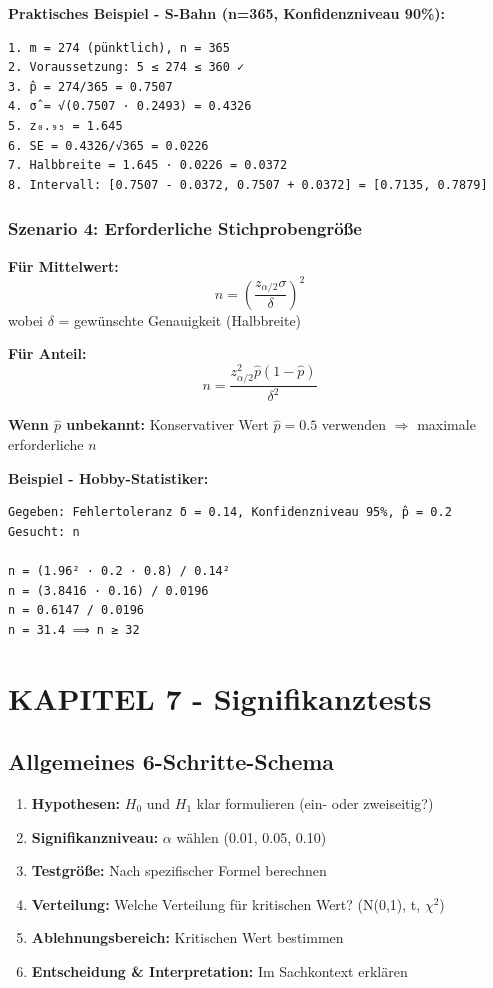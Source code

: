 \documentclass[12pt, a4paper, ngerman]{scrartcl}
\begin{document}
\textbf{Praktisches Beispiel - S-Bahn (n=365, Konfidenzniveau 90\%):}
\begin{verbatim}
1. m = 274 (pünktlich), n = 365
2. Voraussetzung: 5 ≤ 274 ≤ 360 ✓
3. p̂ = 274/365 = 0.7507
4. σ̂ = √(0.7507 · 0.2493) = 0.4326
5. z₀.₉₅ = 1.645
6. SE = 0.4326/√365 = 0.0226
7. Halbbreite = 1.645 · 0.0226 = 0.0372
8. Intervall: [0.7507 - 0.0372, 0.7507 + 0.0372] = [0.7135, 0.7879]
\end{verbatim}

\subsubsection{Szenario 4: Erforderliche Stichprobengröße}

\textbf{Für Mittelwert:}
$$n = \left(\frac{z_{\alpha/2} \sigma}{\delta}\right)^2$$
wobei $\delta$ = gewünschte Genauigkeit (Halbbreite)

\textbf{Für Anteil:}
$$n = \frac{z_{\alpha/2}^2 \hat{p}(1-\hat{p})}{\delta^2}$$

\textbf{Wenn $\hat{p}$ unbekannt:} Konservativer Wert $\hat{p} = 0.5$ verwenden $\Rightarrow$ maximale erforderliche $n$

\textbf{Beispiel - Hobby-Statistiker:}
\begin{verbatim}
Gegeben: Fehlertoleranz δ = 0.14, Konfidenzniveau 95%, p̂ = 0.2
Gesucht: n

n = (1.96² · 0.2 · 0.8) / 0.14²
n = (3.8416 · 0.16) / 0.0196
n = 0.6147 / 0.0196
n = 31.4 ⟹ n ≥ 32
\end{verbatim}

\section{KAPITEL 7 - Signifikanztests}

\subsection{Allgemeines 6-Schritte-Schema}

\begin{enumerate}
  \item \textbf{Hypothesen:} $H_0$ und $H_1$ klar formulieren (ein- oder zweiseitig?)
  \item \textbf{Signifikanzniveau:} $\alpha$ wählen (0.01, 0.05, 0.10)
  \item \textbf{Testgröße:} Nach spezifischer Formel berechnen
  \item \textbf{Verteilung:} Welche Verteilung für kritischen Wert? (N(0,1), t, $\chi^2$)
  \item \textbf{Ablehnungsbereich:} Kritischen Wert bestimmen
  \item \textbf{Entscheidung \& Interpretation:} Im Sachkontext erklären
\end{enumerate}
\end{document}
